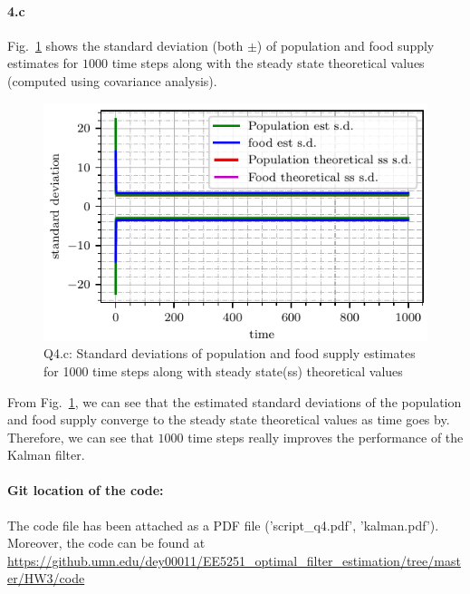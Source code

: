 \paragraph{4.c}Fig.~\ref{fig:q4_std_dev_theoretical_1000} shows the standard deviation (both $\pm$) of population and food supply estimates for $1000$ time steps along with the steady state theoretical values (computed using covariance analysis).
\begin{figure}[!h]
	\centering
	\includegraphics[scale=1.0,trim={0cm 0cm 0cm 0cm},clip]{./code/generatedPlots/q4_std_dev_theoretical_1000.pdf}
	\caption{Q4.c: Standard deviations of population and food supply estimates for 1000 time steps along with steady state(ss) theoretical values}
	\label{fig:q4_std_dev_theoretical_1000}
\end{figure}
From Fig.~\ref{fig:q4_std_dev_theoretical_1000}, we can see that the estimated standard deviations of the population and food supply converge to the steady state theoretical values as time goes by. Therefore, we can see that $1000$ time steps really improves the performance of the Kalman filter.
\paragraph{Git location of the code:} The code file has been attached as a PDF file ('script\_q4.pdf', 'kalman.pdf'). Moreover, the code can be found at\\
\url{https://github.umn.edu/dey00011/EE5251\_optimal\_filter\_estimation/tree/master/HW3/code}